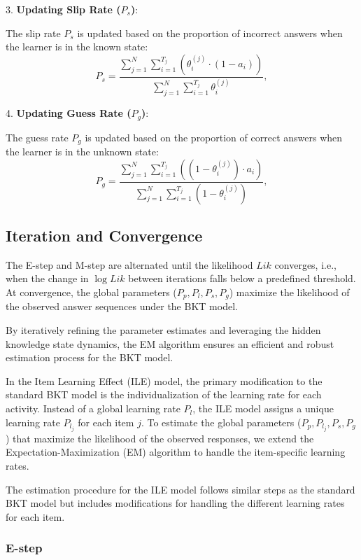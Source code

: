\documentclass{article}
\begin{document}
3. \textbf{Updating Slip Rate (\(P_s\))}:

    The slip rate \(P_s\) is updated based on the proportion of incorrect answers when the learner is in the known state:
    \[
    P_s = \frac{\sum_{j=1}^N \sum_{i=1}^{T_j} \left( \theta_i^{(j)} \cdot (1 - a_i) \right)}{\sum_{j=1}^N \sum_{i=1}^{T_j} \theta_i^{(j)}},
    \]

4. \textbf{Updating Guess Rate (\(P_g\))}:

    The guess rate \(P_g\) is updated based on the proportion of correct answers when the learner is in the unknown state:
    \[
    P_g = \frac{\sum_{j=1}^N \sum_{i=1}^{T_j} \left( (1 - \theta_i^{(j)}) \cdot a_i \right)}{\sum_{j=1}^N \sum_{i=1}^{T_j} (1 - \theta_i^{(j)})},
    \]

\subsection{Iteration and Convergence}
The E-step and M-step are alternated until the likelihood \(Lik\) converges, i.e., when the change in \(\log Lik\) between iterations falls below a predefined threshold. At convergence, the global parameters (\(P_p, P_l, P_s, P_g\)) maximize the likelihood of the observed answer sequences under the BKT model.

By iteratively refining the parameter estimates and leveraging the hidden knowledge state dynamics, the EM algorithm ensures an efficient and robust estimation process for the BKT model.   


In the Item Learning Effect (ILE) model, the primary modification to the standard BKT model is the individualization of the learning rate for each activity. Instead of a global learning rate \( P_l \), the ILE model assigns a unique learning rate \( P_{l_j} \) for each item \( j \). To estimate the global parameters (\( P_p, P_{l_j}, P_s, P_g \)) that maximize the likelihood of the observed responses, we extend the Expectation-Maximization (EM) algorithm to handle the item-specific learning rates.

The estimation procedure for the ILE model follows similar steps as the standard BKT model but includes modifications for handling the different learning rates for each item.

\subsubsection{E-step}
\end{document}
